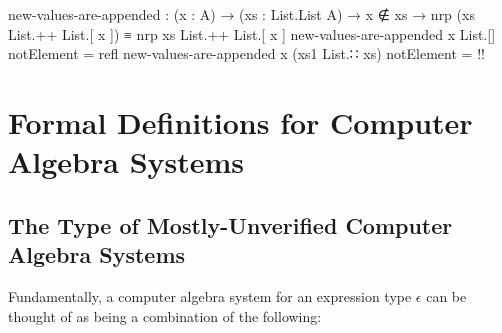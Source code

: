 \documentclass{report}
\begin{document}
\begin{code}
  new-values-are-appended :
    (x : A) →
    (xs : List.List A) →
    x ∉ xs →
    nrp (xs List.++ List.[ x ]) ≡ nrp xs List.++ List.[ x ]
  new-values-are-appended x List.[] notElement = refl
  new-values-are-appended x (xs1 List.∷ xs) notElement = {!!}
\end{code}

\part{Formal Definitions for Computer Algebra Systems}

\chapter{The Type of Mostly-Unverified Computer Algebra Systems}
Fundamentally, a computer algebra system for an expression type \(\epsilon\) can be thought of as being a combination of the following:
\end{document}
